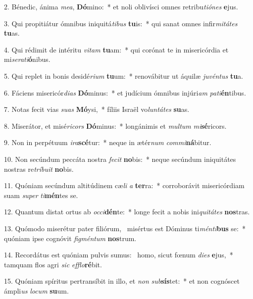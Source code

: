 2. Bénedic, ánima \textit{me}\textit{a}, \textbf{Dó}mino:~*  et noli oblivísci omnes retribu\textit{ti}\textit{ó}\textit{nes} \textbf{e}jus.\

3. Qui propitiátur ómnibus iniquitá\textit{ti}\textit{bus} \textbf{tu}is:~*  qui sanat omnes infir\textit{mi}\textit{tá}\textit{tes} \textbf{tu}as.\

4. Qui rédimit de intéritu \textit{vi}\textit{tam} \textbf{tu}am:~*  qui corónat te in misericórdia et mi\textit{se}\textit{ra}\textit{ti}\textbf{ó}nibus.\

5. Qui replet in bonis desidé\textit{ri}\textit{um} \textbf{tu}um:~*  renovábitur ut áquilæ \textit{ju}\textit{vén}\textit{tus} \textbf{tu}a.\

6. Fáciens misericór\textit{di}\textit{as} \textbf{Dó}minus:~*  et judícium ómnibus injúri\textit{am} \textit{pa}\textit{ti}\textbf{én}tibus.\

7. Notas fecit vias \textit{su}\textit{as} \textbf{Mó}ysi,~*  fíliis Israël vo\textit{lun}\textit{tá}\textit{tes} \textbf{su}as.\

8. Miserátor, et misé\textit{ri}\textit{cors} \textbf{Dó}minus:~*  longánimis et \textit{mul}\textit{tum} \textit{mi}\textbf{sé}ricors.\

9. Non in perpétuum \textit{i}\textit{ra}\textbf{scé}tur:~*  neque in ætér\textit{num} \textit{com}\textit{mi}\textbf{ná}bitur.\

10. Non secúndum peccáta nostra \textit{fe}\textit{cit} \textbf{no}bis:~*  neque secúndum iniquitátes nostras re\textit{trí}\textit{bu}\textit{it} \textbf{no}bis.\

11. Quóniam secúndum altitúdinem cæ\textit{li} \textit{a} \textbf{ter}ra:~*  corroborávit misericórdiam suam \textit{su}\textit{per} \textit{ti}\textbf{mén}tes se.\

12. Quantum distat ortus ab \textit{oc}\textit{ci}\textbf{dén}te:~*  longe fecit a nobis ini\textit{qui}\textit{tá}\textit{tes} \textbf{nos}tras.\

13. Quómodo miserétur pater filiórum, \dag\  misértus est Dóminus ti\textit{mén}\textit{ti}\textbf{bus} se:~*  quóniam ipse cognóvit \textit{fig}\textit{mén}\textit{tum} \textbf{nos}trum.\

14. Recordátus est quóniam pulvis sumus: \dag\  homo, sicut fœnum \textit{di}\textit{es} \textbf{e}jus,~*  tamquam flos agri \textit{sic} \textit{ef}\textit{flo}\textbf{ré}bit.\

15. Quóniam spíritus pertransíbit in illo, et \textit{non} \textit{sub}\textbf{sís}tet:~*  et non cognóscet ámpli\textit{us} \textit{lo}\textit{cum} \textbf{su}um.\

